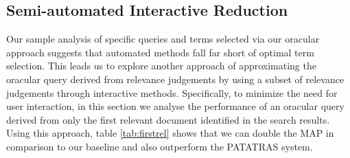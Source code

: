 \subsection{Semi-automated Interactive Reduction}
\label{sec:SemiAutomatedInteractiveReduction}
Our sample analysis of specific queries and terms selected via our oracular
approach suggests that automated methods fall far short of optimal term selection.
This leads us to explore another approach of approximating the oracular query
derived from relevance judgements by using a subset of relevance judgements
through interactive methods.  Specifically, to minimize the need for user interaction,
in this section we analyse the performance of an oracular query derived from
only the first relevant document identified in the search results.
Using this approach, table \ref{tab:firstrel} shows that we can double the MAP in comparison to our baseline and also outperform the PATATRAS system.

